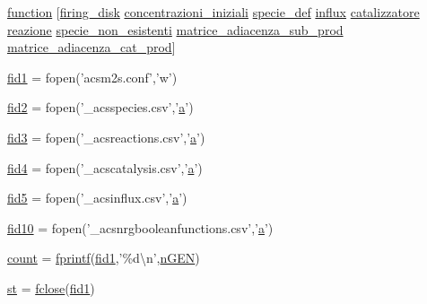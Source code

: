 \begin{DoxyCompactItemize}
\item 
\hyperlink{a00068_a4b4c670b101bf7a838f775e008fa6255}{function} \mbox{[}\hyperlink{a00061_acb72987b5000cf59c6f81c482e2ac8ac}{firing\-\_\-disk} \hyperlink{a00061_a89801fa89eee3ba40f6610f290d6f6c3}{concentrazioni\-\_\-iniziali} \hyperlink{a00068_a85d979dc881d9a49537b0f43daa2b360}{specie\-\_\-def} \hyperlink{a00065_a902e747aeec6b345d3a057099152f41f}{influx} \hyperlink{a00060_a14959eaa108dcffcec704a207775f7e8}{catalizzatore} \hyperlink{a00068_a65cf6e12ba9a8c10222f3f1f71f7c95f}{reazione} \hyperlink{a00068_adfcfd2749a68fa87ece8ec3caa194b3d}{specie\-\_\-non\-\_\-esistenti} \hyperlink{a00062_a3568a7566d3871de5460f8fe96044c26}{matrice\-\_\-adiacenza\-\_\-sub\-\_\-prod} \hyperlink{a00062_a23c87a364bec91d4eb554b9eabe0b767}{matrice\-\_\-adiacenza\-\_\-cat\-\_\-prod}\mbox{]}
\item 
\hyperlink{a00068_aff1e821fc5f97a0758f74b5cbd00cacf}{fid1} = fopen('acsm2s.\-conf','w')
\item 
\hyperlink{a00068_a11af2c31c7926441f43875d99b4577d2}{fid2} = fopen('\-\_\-acsspecies.\-csv','\hyperlink{a00035_a2ffdbad9ea59541e59cbd2b938e0770c}{a}')
\item 
\hyperlink{a00068_a153e3250d4161f9bea4c140498016d94}{fid3} = fopen('\-\_\-acsreactions.\-csv','\hyperlink{a00035_a2ffdbad9ea59541e59cbd2b938e0770c}{a}')
\item 
\hyperlink{a00068_a28f0b3b80ef3c84a4a00660a307d2147}{fid4} = fopen('\-\_\-acscatalysis.\-csv','\hyperlink{a00035_a2ffdbad9ea59541e59cbd2b938e0770c}{a}')
\item 
\hyperlink{a00068_af5f7ad66ed343bca8289a4d44dbff04f}{fid5} = fopen('\-\_\-acsinflux.\-csv','\hyperlink{a00035_a2ffdbad9ea59541e59cbd2b938e0770c}{a}')
\item 
\hyperlink{a00068_aadad4fd2d661ea2b9f0c3a95e3f7b4ba}{fid10} = fopen('\-\_\-acsnrgbooleanfunctions.\-csv','\hyperlink{a00035_a2ffdbad9ea59541e59cbd2b938e0770c}{a}')
\item 
\hyperlink{a00068_aa0a4866d2600caeb20cfacee8eefc922}{count} = \hyperlink{a00068_aa6dc40efe43a338c9ff278260d95b4d9}{fprintf}(\hyperlink{a00068_aff1e821fc5f97a0758f74b5cbd00cacf}{fid1},'\%d\textbackslash{}n',\hyperlink{a00070_a82556659f7ba7219e55a18e9b9e63873}{n\-G\-E\-N})
\item 
\hyperlink{a00068_afbed6b4ecdae7969c5b47d7d4e71495f}{st} = \hyperlink{a00033_a66a54a4db5a27a03991b5f3034bbc6a4}{fclose}(\hyperlink{a00068_aff1e821fc5f97a0758f74b5cbd00cacf}{fid1})
\item 

\end{DoxyCompactItemize}
